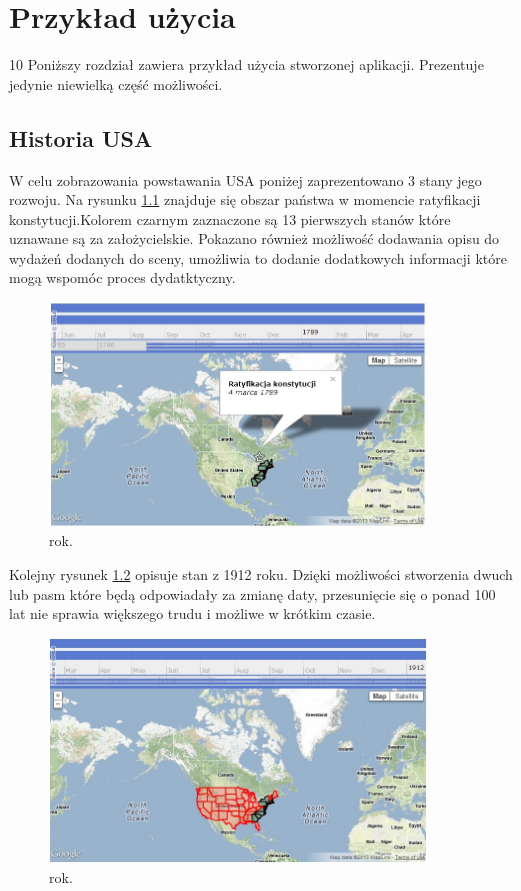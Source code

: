 \chapter{Przykład użycia}
\label{sec:useexample}
10 %
Poniższy rozdział zawiera przykład użycia stworzonej aplikacji. Prezentuje jedynie niewielką część możliwości.


\section{Historia USA}
\label{sec:usahistory}

W celu zobrazowania powstawania USA poniżej zaprezentowano 3 stany jego rozwoju. Na rysunku \ref{fig:st1} znajduje się obszar państwa w momencie ratyfikacji konstytucji.Kolorem czarnym zaznaczone są 13 pierwszych stanów które uznawane są za założycielskie. Pokazano również możliwość dodawania opisu do wydażeń dodanych do sceny, umożliwia to dodanie dodatkowych informacji które mogą wspomóc proces dydatktyczny.

\begin{figure}[H]
  \centering
    \includegraphics[width=100mm]{ge/st1.jpg}
  \caption{rok.}
  \label{fig:st1}
\end{figure}

Kolejny rysunek \ref{fig:st2} opisuje stan z 1912 roku. Dzięki możliwości stworzenia dwuch lub pasm które będą odpowiadały za zmianę daty, przesunięcie się o ponad 100 lat nie sprawia większego trudu i możliwe w krótkim czasie.

\begin{figure}[H]
  \centering
    \includegraphics[width=100mm]{ge/st2.jpg}
  \caption{rok.}
  \label{fig:st2}
\end{figure}

